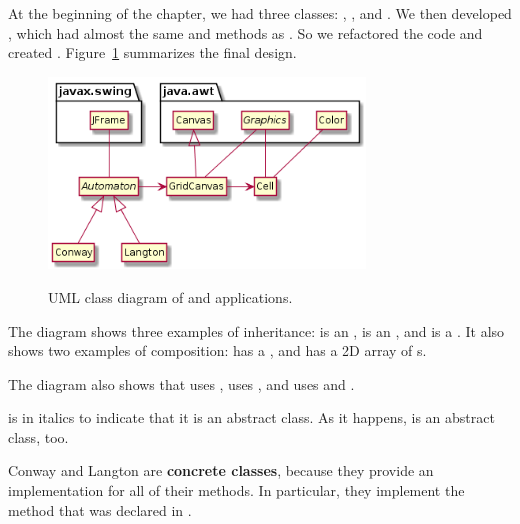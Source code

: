 At the beginning of the chapter, we had three classes: , , and .
We then developed , which had almost the same  and  methods as .
So we refactored the code and created .
Figure~\ref{fig:uml2} summarizes the final design.

\begin{figure}[!ht]
\begin{center}
\includegraphics[width=0.75\textwidth,alt={UML class diagram showing inheritance relationships with Automaton as abstract parent class, Conway and Langton as concrete subclasses, GridCanvas extending Canvas, and composition relationships showing how classes contain other objects}]{figs/uml2.png}
\caption{UML class diagram of  and  applications.}
\label{fig:uml2}
\end{center}
\end{figure}


The diagram shows three examples of inheritance:  is an ,  is an , and  is a .
It also shows two examples of composition:  has a , and  has a 2D array of s.

The diagram also shows that  uses ,  uses , and  uses  and .

 is in italics to indicate that it is an abstract class.
As it happens,  is an abstract class, too.


Conway and Langton are {\bf concrete classes}, because they provide an implementation for all of their methods.
In particular, they implement the  method that was declared  in .


